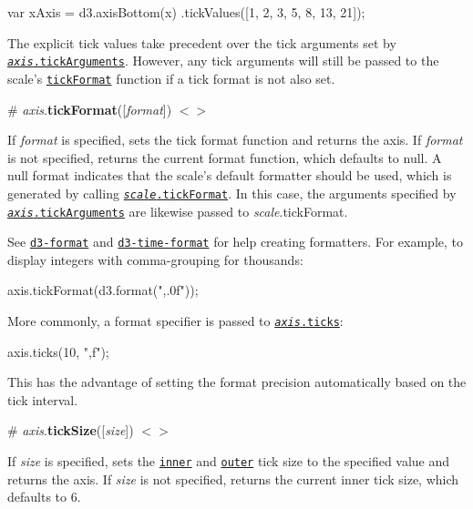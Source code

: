 \begin{DoxyCode}
var xAxis = d3.axisBottom(x)
    .tickValues([1, 2, 3, 5, 8, 13, 21]);
\end{DoxyCode}


The explicit tick values take precedent over the tick arguments set by \href{#axis_tickArguments}{\tt {\itshape axis}.tick\+Arguments}. However, any tick arguments will still be passed to the scale’s \href{#axis_tickFormat}{\tt tick\+Format} function if a tick format is not also set.

\label{_axis_tickFormat}%
\# {\itshape axis}.{\bfseries tick\+Format}(\mbox{[}{\itshape format}\mbox{]}) \href{https://github.com/d3/d3-axis/blob/master/src/axis.js#L136}{\tt $<$$>$}

If {\itshape format} is specified, sets the tick format function and returns the axis. If {\itshape format} is not specified, returns the current format function, which defaults to null. A null format indicates that the scale’s default formatter should be used, which is generated by calling \href{https://github.com/d3/d3-scale/blob/master/README.md#continuous_tickFormat}{\tt {\itshape scale}.tick\+Format}. In this case, the arguments specified by \href{#axis_tickArguments}{\tt {\itshape axis}.tick\+Arguments} are likewise passed to {\itshape scale}.tick\+Format.

See \href{https://github.com/d3/d3-format}{\tt d3-\/format} and \href{https://github.com/d3/d3-time-format}{\tt d3-\/time-\/format} for help creating formatters. For example, to display integers with comma-\/grouping for thousands\+:


\begin{DoxyCode}
axis.tickFormat(d3.format(",.0f"));
\end{DoxyCode}


More commonly, a format specifier is passed to \href{#axis_ticks}{\tt {\itshape axis}.ticks}\+:


\begin{DoxyCode}
axis.ticks(10, ",f");
\end{DoxyCode}


This has the advantage of setting the format precision automatically based on the tick interval.

\label{_axis_tickSize}%
\# {\itshape axis}.{\bfseries tick\+Size}(\mbox{[}{\itshape size}\mbox{]}) \href{https://github.com/d3/d3-axis/blob/master/src/axis.js#L140}{\tt $<$$>$}

If {\itshape size} is specified, sets the \href{#axis_tickSizeInner}{\tt inner} and \href{#axis_tickSizeOuter}{\tt outer} tick size to the specified value and returns the axis. If {\itshape size} is not specified, returns the current inner tick size, which defaults to 6.

